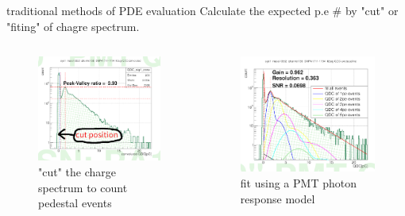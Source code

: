 \documentclass[11pt,compress,xcolor=x11names,UTF8]{beamer}
\begin{document}
\begin{frame}{traditional methods of PDE evaluation}
Calculate the expected p.e # by "cut" or "fiting" of chagre spectrum.
\begin{columns}
\begin{column}{.485\textwidth}
\begin{figure}
\centering
\includegraphics[width=\textwidth]{figure/specut.png} %
\caption{"cut" the charge spectrum to count pedestal events}
\end{figure}
\end{column}
\begin{column}{.5\textwidth}
\begin{figure}
\centering
\includegraphics[width=\textwidth]{figure/spefit.png} %
\caption{fit using a PMT photon response model}
\end{figure}
\end{column}
\end{columns}
\end{frame}
\end{document}
